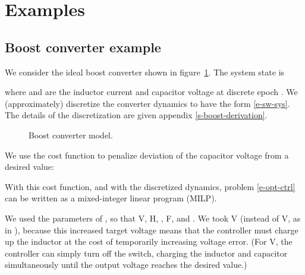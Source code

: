 \documentclass[12pt]{article}
\begin{document}
\section{Examples}
\label{s-examples}

\subsection{Boost converter example}




\label{s-boost-example}
We consider the ideal boost converter shown in figure~\ref{f-boost}.
The system state is

where  and  are the inductor current and capacitor
voltage at discrete epoch .
We (approximately) discretize the converter dynamics
to have the form \eqref{e-sw-sys}.
The details of the discretization are given appendix \ref{s-boost-derivation}.

\begin{figure}
\centering
{}
\caption{
Boost converter model.
}
\label{f-boost}
\end{figure}




We use the cost function to 
penalize deviation of the capacitor voltage from a desired value:

With this cost function, 
and with the discretized dynamics, problem \eqref{e-opt-ctrl}  can be written as a mixed-integer linear program (MILP).


We used the parameters of \cite{karamanakos2013direct},
so that
 V,
 H,
 ,
 F,
and
 .
We took  V
(instead of  V, as in \cite{karamanakos2013direct}),
because this increased target voltage means that the controller must
charge up the inductor at the cost of temporarily increasing voltage error.
(For  V,
the controller can simply turn off the switch,
charging the inductor and capacitor simultaneously
until the output voltage reaches the desired value.)
\end{document}
